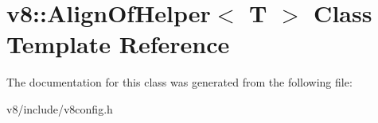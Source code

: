 \hypertarget{classv8_1_1AlignOfHelper}{\section{v8\-:\-:Align\-Of\-Helper$<$ T $>$ Class Template Reference}
\label{classv8_1_1AlignOfHelper}
}


The documentation for this class was generated from the following file\-:\begin{DoxyCompactItemize}
\item 
v8/include/v8config.\-h\end{DoxyCompactItemize}
